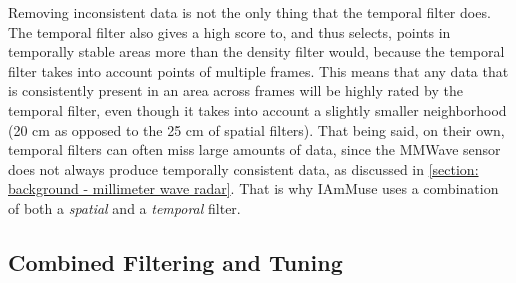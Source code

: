Removing inconsistent data is not the only thing that the temporal filter does.
The temporal filter also gives a high score to, and thus selects, points in temporally stable areas more than the density filter would, because the temporal filter takes into account points of multiple frames.
This means that any data that is consistently present in an area across frames will be highly rated by the temporal filter, even though it takes into account a slightly smaller neighborhood (20 cm as opposed to the 25 cm of spatial filters).
That being said, on their own, temporal filters can often miss large amounts of data, since the MMWave sensor does not always produce temporally consistent data, as discussed in \cref{section: background - millimeter wave radar}.
That is why IAmMuse uses a combination of both a \textit{spatial} and a \textit{temporal} filter.


% 


\subsection{Combined Filtering and Tuning}
\label{sub-section: tracking method - data filtering - combined filtering and tuning}

